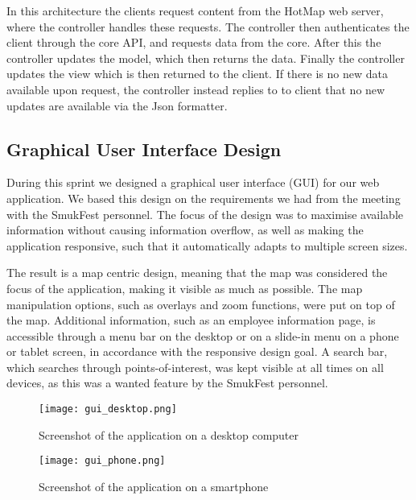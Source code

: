 

In this architecture the clients request content from the HotMap web server, where the controller handles these requests. The controller then authenticates the client through the core API, and requests data from the core. After this the controller updates the model, which then returns the data. Finally the controller updates the view which is then returned to the client. If there is no new data available upon request, the controller instead replies to to client that no new updates are available via the Json formatter.

\subsection{Graphical User Interface Design} \label{sec:s2_gui}

During this sprint we designed a graphical user interface (GUI) for our web application. We based this design on the requirements we had from the meeting with the SmukFest personnel. The focus of the design was to maximise available information without causing information overflow, as well as making the application responsive, such that it automatically adapts to multiple screen sizes. 

The result is a map centric design, meaning that the map was considered the focus of the application, making it visible as much as possible. The map manipulation options, such as overlays and zoom functions, were put on top of the map. Additional information, such as an employee information page, is accessible through a menu bar on the desktop or on a slide-in menu on a phone or tablet screen, in accordance with the responsive design goal. A search bar, which searches through points-of-interest, was kept visible at all times on all devices, as this was a wanted feature by the SmukFest personnel.

\begin{figure}
    \centering
\texttt{[image: gui\_desktop.png]}
\caption{Screenshot of the application on a desktop computer}
\label{desktopscreenshot}
\end{figure}

\begin{figure}
    \centering
\texttt{[image: gui\_phone.png]}
\caption{Screenshot of the application on a smartphone}
\label{phonescreenshot}
\end{figure}
